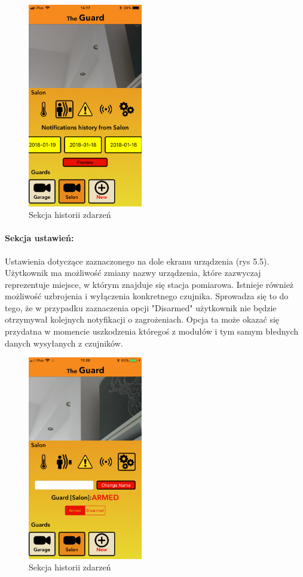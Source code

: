 \begin{figure}[h]
	\centering
	\includegraphics[width=5cm]{history.png}
	\caption{Sekcja historii zdarzeń}
\end{figure}


\paragraph{Sekcja ustawień:}
Ustawienia dotyczące zaznaczonego na dole ekranu urządzenia (rys 5.5). Użytkownik ma możliwość zmiany nazwy urządzenia, które zazwyczaj reprezentuje miejsce, w którym znajduje się stacja pomiarowa. Istnieje również możliwość uzbrojenia i wyłączenia konkretnego czujnika. Sprowadza się to do tego, że w przypadku zaznaczenia opcji "Disarmed" użytkownik nie będzie otrzymywał kolejnych notyfikacji o zagrożeniach. Opcja ta może okazać się przydatna w momencie uszkodzenia któregoś z modułów i tym samym błednych danych wysyłanych z czujników.

\begin{figure}[h]
	\centering
	\includegraphics[width=5cm]{settings.png}
	\caption{Sekcja historii zdarzeń}
\end{figure}



